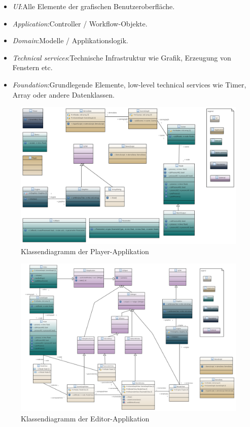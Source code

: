 \begin{itemize}
    \item[]
        \textit{UI}:\@ Alle Elemente der grafischen Benutzeroberfläche.
    \item[]
        \textit{Application}:\@ Controller / Workflow-Objekte.
    \item[]
        \textit{Domain}:\@ Modelle / Applikationslogik.
    \item[]
        \textit{Technical services}:\@ Technische Infrastruktur wie Grafik, Erzeugung von
        Fenstern etc.
    \item[]
        \textit{Foundation}:\@ Grundlegende Elemente, low-level technical services wie
        Timer, Array oder andere Datenklassen.
\end{itemize}

\begin{figure}[H]
    \centering
    \includegraphics[angle=90,width=1.0\textwidth]{img/player_class_diagram.PNG}
    \caption{Klassendiagramm der
        Player-Applikation}\label{fig:class-diagram:player}
\end{figure}

\begin{figure}[H]
    \centering
    \includegraphics[angle=90,width=1.1\textwidth]{img/editor_class_diagram.PNG}
    \caption{Klassendiagramm der
        Editor-Applikation}\label{fig:class-diagram:editor}
\end{figure}
